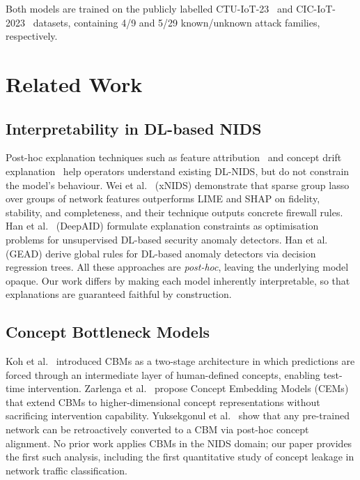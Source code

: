 \documentclass[journal]{IEEEtran}
\begin{document}
Both models are trained on the publicly labelled CTU-IoT-23~\cite{parmisano2020ctu}
and CIC-IoT-2023~\cite{neto2023ciciot} datasets, containing
4/9 and 5/29 known/unknown attack families, respectively.

\section{Related Work}

\subsection{Interpretability in DL-based NIDS}

Post-hoc explanation techniques such as feature
attribution~\cite{wei2023xnids} and concept drift
explanation~\cite{yang2021cade} help operators understand existing
DL-NIDS, but do not constrain the model's behaviour.
Wei et al.~\cite{wei2023xnids} (xNIDS) demonstrate that sparse group
lasso over groups of network features outperforms LIME and SHAP on
fidelity, stability, and completeness, and their technique outputs
concrete firewall rules.
Han et al.~\cite{han2021deepaid} (DeepAID) formulate explanation
constraints as optimisation problems for unsupervised DL-based security
anomaly detectors.
Han et al.~\cite{han2024gead} (GEAD) derive global rules for DL-based
anomaly detectors via decision regression trees.
All these approaches are \emph{post-hoc}, leaving the underlying model
opaque. Our work differs by making each model inherently interpretable,
so that explanations are guaranteed faithful by construction.

\subsection{Concept Bottleneck Models}

Koh et al.~\cite{koh2020concept} introduced CBMs as a two-stage
architecture in which predictions are forced through an intermediate
layer of human-defined concepts, enabling test-time intervention.
Zarlenga et al.~\cite{zarlenga2022concept} propose Concept Embedding
Models (CEMs) that extend CBMs to higher-dimensional concept
representations without sacrificing intervention capability.
Yuksekgonul et al.~\cite{yuksekgonul2023posthoc} show that any
pre-trained network can be retroactively converted to a CBM via
post-hoc concept alignment.
No prior work applies CBMs in the NIDS domain; our paper provides the
first such analysis, including the first quantitative study of concept
leakage in network traffic classification.
\end{document}
